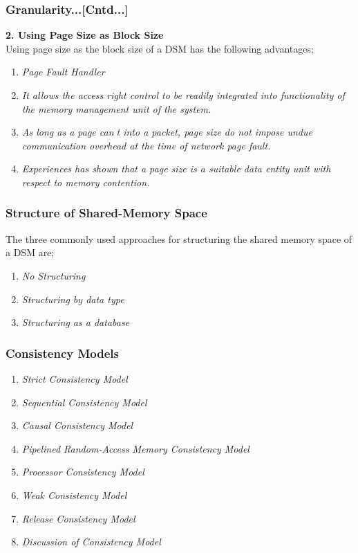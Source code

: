\documentclass{beamer}
\begin{document}
\begin{frame}
	\frametitle{Granularity...[Cntd...]}
	\textbf{2. Using Page Size as Block Size}\\
	\vspace{0.5cm}
	Using page size as the block size of a DSM has the following advantages;
	\vspace{0.5cm}
	\begin{enumerate}
		\item \textit{Page Fault Handler}
		\item \textit{It allows the access right control to be readily integrated into functionality of the memory management unit of the system.}
		\item \textit{As long as a page cant into a packet, page size do not impose undue communication overhead at the time of network page fault.}
		\item \textit{Experiences has shown that a page size is a suitable data entity unit with respect to memory contention.}
	\end{enumerate}
\end{frame}


\begin{frame}
	\frametitle{Structure of Shared-Memory Space}
	The three commonly used approaches for structuring the shared memory space of a DSM are;
	\vspace{0.5cm}
	\begin{enumerate}
		\item \textit{No Structuring}
		\item \textit{Structuring by data type}
		\item \textit{Structuring as a database}
	\end{enumerate}
	\vspace{4cm}
\end{frame}


\begin{frame}
	\frametitle{Consistency Models}
	\vspace{0.5cm}
	\begin{enumerate}
		\item \textit{Strict Consistency Model}
		\item \textit{Sequential Consistency Model}
		\item \textit{Causal Consistency Model}
		\item \textit{Pipelined Random-Access Memory Consistency Model}
		\item \textit{Processor Consistency Model}
		\item \textit{Weak Consistency Model}
		\item \textit{Release Consistency Model}
		\item \textit{Discussion of Consistency Model}
	\end{enumerate}
	\vspace{4cm}
\end{frame}
\end{document}
